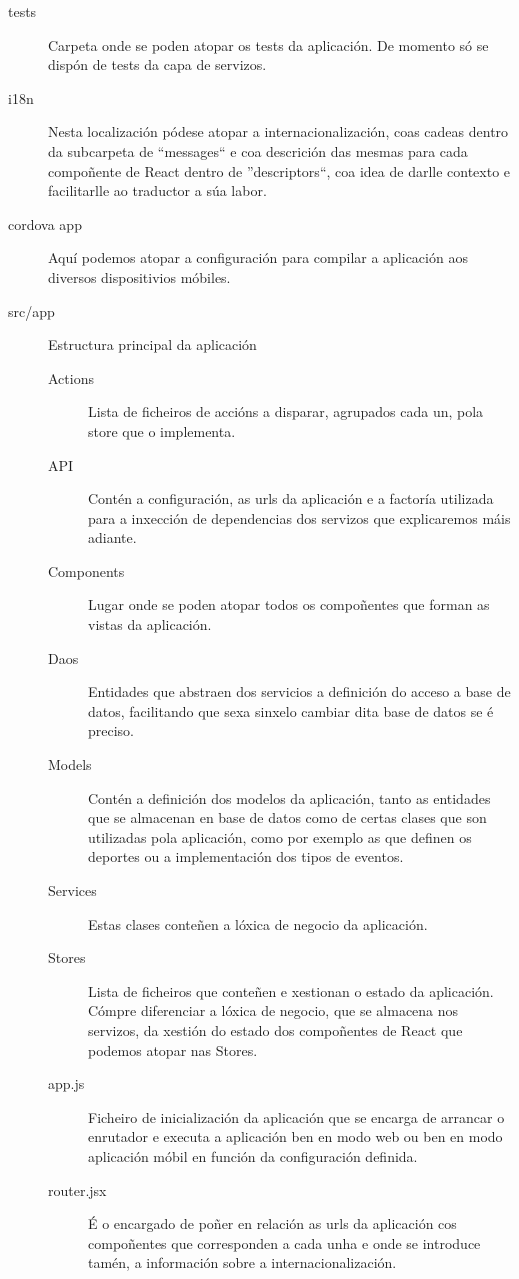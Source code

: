       \begin{description}
        \item [tests] Carpeta onde se poden atopar os tests da aplicación. De 
momento só se dispón de tests da capa de servizos.
        \item [i18n] Nesta localización pódese atopar a internacionalización, 
coas cadeas dentro da subcarpeta de ``messages`` e coa descrición das mesmas 
para cada compoñente de React dentro de ''descriptors``, coa idea de darlle 
contexto e facilitarlle ao traductor a súa labor.
        \item [cordova app] Aquí podemos atopar a configuración para compilar a 
aplicación aos diversos dispositivios móbiles.
        \item [src/app] Estructura principal da aplicación
        \begin{description}
          \item [Actions] Lista de ficheiros de accións a disparar, agrupados 
cada un, pola store que o implementa.
          \item [API] Contén a configuración, as urls da aplicación e a 
factoría utilizada para a inxección de dependencias dos servizos que 
explicaremos máis adiante.
          \item [Components] Lugar onde se poden atopar todos os compoñentes 
que forman as vistas da aplicación. 
          \item [Daos] Entidades que abstraen dos servicios a definición do 
acceso a base de datos, facilitando que sexa sinxelo cambiar dita base de datos 
se é preciso.
          \item [Models] Contén a definición dos modelos da aplicación, tanto as 
entidades que se almacenan en base de datos como de certas clases que son 
utilizadas pola aplicación, como por exemplo as que definen os deportes ou a 
implementación dos tipos de eventos.
          \item [Services] Estas clases conteñen a lóxica de negocio da 
aplicación.
          \item [Stores] Lista de ficheiros que conteñen e xestionan o estado da 
aplicación. Cómpre diferenciar a lóxica de negocio, que se almacena nos 
servizos, da xestión do estado dos compoñentes de React que podemos atopar nas 
Stores.
          \item [app.js] Ficheiro de inicialización da aplicación que se encarga 
de arrancar o enrutador e executa a aplicación ben en modo web ou ben en modo 
aplicación móbil en función da configuración definida.
          \item [router.jsx] É o encargado de poñer en relación as urls da 
aplicación cos compoñentes que corresponden a cada unha e onde se introduce 
tamén, a información sobre a internacionalización.

        \end{description}

      \end{description}


